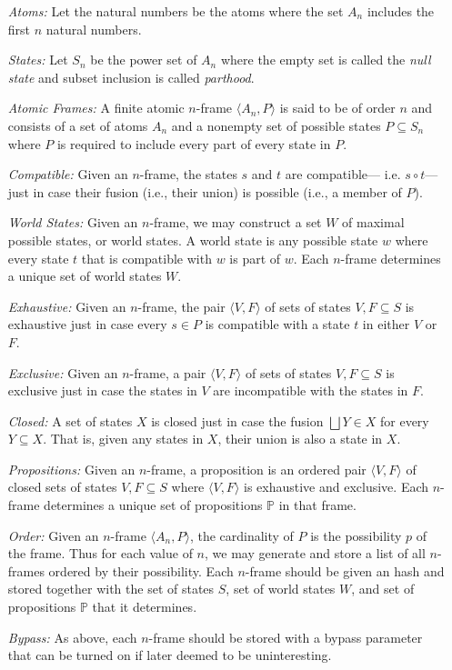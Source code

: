 \documentclass[a4paper, 11pt]{article} %
\newcommand{\tuple}[1]{\langle#1\rangle} %
\renewcommand{\P}[0]{\mathbb{P}}
\begin{document}
\begin{enumerate}
  \item[\it Atoms:] Let the natural numbers be the atoms where the set $A_n$ includes the first $n$ natural numbers.
  \item[\it States:] Let $S_n$ be the power set of $A_n$ where the empty set is called the \textit{null state} and subset inclusion is called \textit{parthood}.
  \item[\it Atomic Frames:] A finite atomic $n$-frame $\tuple{A_n,P}$ is said to be of order $n$ and consists of a set of atoms $A_n$ and a nonempty set of possible states $P\subseteq S_n$ where $P$ is required to include every part of every state in $P$.
  \item[\it Compatible:] Given an $n$-frame, the states $s$ and $t$ are compatible--- i.e. $s\circ t$--- just in case their fusion (i.e., their union) is possible (i.e., a member of $P$).
  \item[\it World States:] Given an $n$-frame, we may construct a set $W$ of maximal possible states, or world states. A world state is any possible state $w$ where every state $t$ that is compatible with $w$ is part of $w$. Each $n$-frame determines a unique set of world states $W$.
  \item[\it Exhaustive:] Given an $n$-frame, the pair $\tuple{V,F}$ of sets of states $V,F\subseteq S$ is exhaustive just in case every $s\in P$ is compatible with a state $t$ in either $V$ or $F$. 
  \item[\it Exclusive:] Given an $n$-frame, a pair $\tuple{V,F}$ of sets of states $V,F\subseteq S$ is exclusive just in case the states in $V$ are incompatible with the states in $F$. 
  \item[\it Closed:] A set of states $X$ is closed just in case the fusion $\bigsqcup Y\in X$ for every $Y\subseteq X$. That is, given any states in $X$, their union is also a state in $X$.
  \item[\it Propositions:] Given an $n$-frame, a proposition is an ordered pair $\tuple{V,F}$ of closed sets of states $V,F\subseteq S$ where $\tuple{V,F}$ is exhaustive and exclusive. Each $n$-frame determines a unique set of propositions $\P$ in that frame. 
  \item[\it Order:] Given an $n$-frame $\tuple{A_n,P}$, the cardinality of $P$ is the possibility $p$ of the frame. Thus for each value of $n$, we may generate and store a list of all $n$-frames ordered by their possibility. Each $n$-frame should be given an hash and stored together with the set of states $S$, set of world states $W$, and set of propositions $\P$ that it determines.
  \item[\it Bypass:] As above, each $n$-frame should be stored with a bypass parameter that can be turned on if later deemed to be uninteresting.
\end{enumerate}
\end{document}
